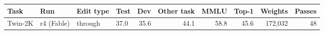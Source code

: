 \begin{tabular}{llllrrrrrr}
\toprule
Task & Run & Edit type & Test & Dev & Other task & MMLU & Top-1 & Weights & Passes \\
\midrule
Twin-2K & r4 (Fable) & through & 37.0 & 35.6 & 44.1 & 58.8 & 45.6 & 172,032 & 48 \\
\bottomrule
\end{tabular}
